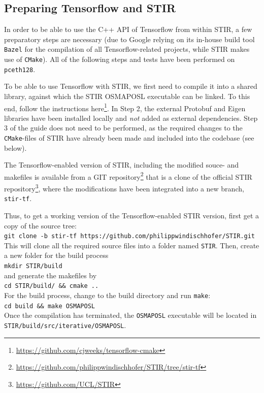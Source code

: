 \documentclass[a4paper, 11pt]{article}
\begin{document}
  \subsection{Preparing Tensorflow and STIR}
  In order to be able to use the C++ API of Tensorflow from within STIR, a few preparatory steps are necessary (due to Google relying on its in-house build tool \texttt{Bazel} for the compilation of all Tensorflow-related projects, while STIR makes use of \texttt{CMake}). All of the following steps and tests have been performed on \texttt{pceth128}. 

  To be able to use Tensorflow with STIR, we first need to compile it into a shared library, against which the STIR OSMAPOSL executable can be linked. To this end, follow the instructions here\footnote{\url{https://github.com/cjweeks/tensorflow-cmake}}. In Step 2, the external Protobuf and Eigen libraries have been installed locally and \textsl{not} added as external dependencies. Step 3 of the guide does not need to be performed, as the required changes to the \texttt{CMake}-files of STIR have already been made and included into the codebase (see below).


  The Tensorflow-enabled version of STIR, including the modified souce- and makefiles is available from a GIT repository\footnote{\url{https://github.com/philippwindischhofer/STIR/tree/stir-tf}} that is a clone of the official STIR repository\footnote{\url{https://github.com/UCL/STIR}}, where the modifications have been integrated into a new branch, \texttt{stir-tf}.

  Thus, to get a working version of the Tensorflow-enabled STIR version, first get a copy of the source tree:\\
  \texttt{git clone -b stir-tf https://github.com/philippwindischhofer/STIR.git}\\
  This will clone all the required source files into a folder named \texttt{STIR}. Then, create a new folder for the build process\\
  \texttt{mkdir STIR/build}\\
  and generate the makefiles by\\
  \texttt{cd STIR/build/ \&\& cmake ..}\\
  For the build process, change to the build directory and run \texttt{make}:\\
  \texttt{cd build \&\& make OSMAPOSL}\\

  Once the compilation has terminated, the \texttt{OSMAPOSL} executable will be located in \texttt{STIR/build/src\-/iterative/OSMAPOSL}.  
  
\end{document}
